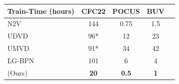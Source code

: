 \vspace{0pt} %
\begin{tabular}{l c c c c}
\toprule
 \textbf{Train-Time (hours)} & CFC22 & POCUS & BUV \\
\hline
N2V \cite{krull2019noise2void} &  144 & 0.75 & 1.5\\
UDVD \cite{Sheth_2021_ICCV} & 96* & 12 & 23 \\
UMVD \cite{UMVD} & 91* & 34 & 42\\
LG-BPN \cite{wang2023lgbpn} & 101 & 6 & 4 \\
\NAME{} (Ours) & \textbf{20} & \textbf{0.5} & \textbf{1}\\
\end{tabular}